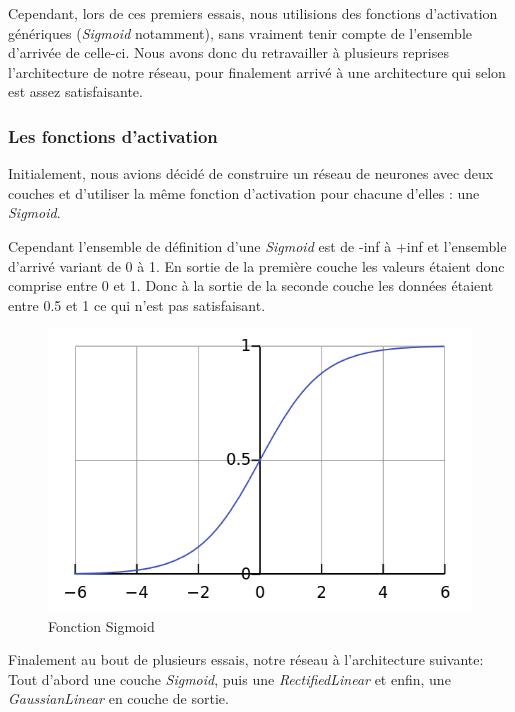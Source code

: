 \documentclass[12pt, a4paper]{article}
\begin{document}
Cependant, lors de ces premiers essais, nous utilisions des fonctions d'activation génériques (\emph{Sigmoid} notamment), sans vraiment tenir compte de l'ensemble d'arrivée de celle-ci. 
Nous avons donc du retravailler à plusieurs reprises l'architecture de notre réseau, pour finalement arrivé à une architecture qui selon est assez satisfaisante. 

	\subsubsection{Les fonctions d'activation}
Initialement, nous avions décidé de construire un réseau de neurones avec deux couches et d'utiliser la même fonction d'activation pour chacune d'elles : une \emph{Sigmoid}.

Cependant l'ensemble de définition d'une \emph{Sigmoid} est de -inf à +inf et l'ensemble d'arrivé variant de 0 à 1. En sortie de la première couche les valeurs étaient donc comprise entre 0 et 1. Donc à la sortie de la seconde couche les données étaient entre 0.5 et 1 ce qui n'est pas satisfaisant. 

\begin{figure}[h!]
  \centering
  \includegraphics[scale=0.4]{Images/sigmoid.png}
  \caption{Fonction Sigmoid}
\end{figure}

Finalement au bout de plusieurs essais, notre réseau à l'architecture suivante:
Tout d'abord une couche \emph{Sigmoid}, puis une \emph{ RectifiedLinear} et enfin, une \emph{GaussianLinear} en couche de sortie.
\end{document}
